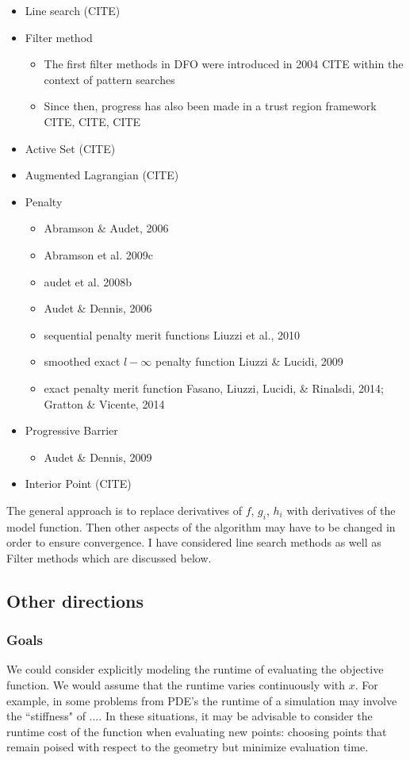 \documentclass{article}
\begin{document}
\begin{itemize}
	\item Line search (CITE)
	\item Filter method
	\begin{itemize}
		\item The first filter methods in DFO were introduced in 2004 CITE within the context of pattern searches
		\item Since then, progress has also been made in a trust region framework CITE, CITE, CITE
	\end{itemize}
	\item Active Set (CITE)
	\item Augmented Lagrangian (CITE)
	\item Penalty
	\begin{itemize}
		\item Abramson \& Audet, 2006
		\item Abramson et al. 2009c
		\item audet et al. 2008b
		\item Audet \& Dennis, 2006
		\item sequential penalty merit functions Liuzzi et al., 2010
		\item smoothed exact $l-\infty$ penalty function Liuzzi \& Lucidi, 2009
		\item exact penalty merit function Fasano, Liuzzi, Lucidi, \& Rinalsdi, 2014; Gratton \& Vicente, 2014
	\end{itemize}
	\item Progressive Barrier
	\begin{itemize}
		\item Audet \& Dennis, 2009
	\end{itemize}
	\item Interior Point (CITE)
\end{itemize}

The general approach is to replace derivatives of $f$, $g_i$, $h_i$ with derivatives of the model function.
Then other aspects of the algorithm may have to be changed in order to ensure convergence.
I have considered line search methods as well as Filter methods which are discussed below.





\subsection{Other directions}
\subsubsection{Goals}
We could consider explicitly modeling the runtime of evaluating the objective function.
We would assume that the runtime varies continuously with $x$.
For example, in some problems from PDE's the runtime of a simulation may involve the ``stiffness" of $\ldots$.
In these situations, it may be advisable to consider the runtime cost of the function when evaluating new points:
choosing points that remain poised with respect to the geometry but minimize evaluation time.
\end{document}
